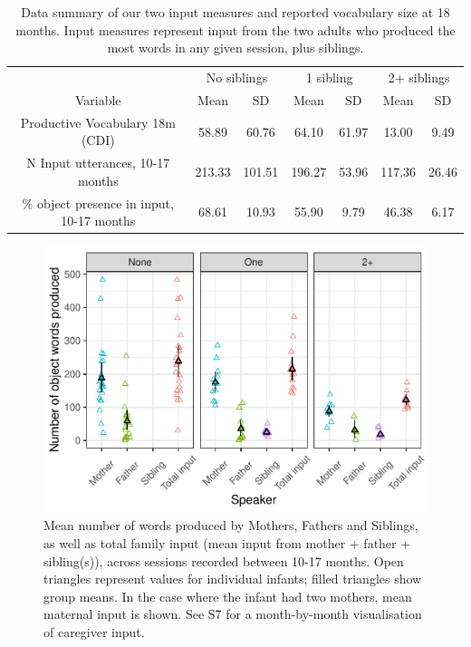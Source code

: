 \documentclass[
  man,mask,floatsintext]{apa6}
\begin{document}
\begin{table}[!h]

\caption{\label{tab:table-data-summary}Data summary of our two input measures and reported vocabulary size at 18 months. Input measures represent input from the two adults who produced the most words in any given session, plus siblings.}
\centering
\begin{tabular}[t]{ccccccc}
\toprule
\multicolumn{1}{c}{ } & \multicolumn{2}{c}{No siblings} & \multicolumn{2}{c}{1 sibling} & \multicolumn{2}{c}{2+ siblings} \\
\cmidrule(l{3pt}r{3pt}){2-3} \cmidrule(l{3pt}r{3pt}){4-5} \cmidrule(l{3pt}r{3pt}){6-7}
\multicolumn{1}{c}{Variable} & \multicolumn{1}{c}{Mean} & \multicolumn{1}{c}{SD} & \multicolumn{1}{c}{Mean} & \multicolumn{1}{c}{SD} & \multicolumn{1}{c}{Mean} & \multicolumn{1}{c}{SD} \\
\cmidrule(l{3pt}r{3pt}){1-1} \cmidrule(l{3pt}r{3pt}){2-2} \cmidrule(l{3pt}r{3pt}){3-3} \cmidrule(l{3pt}r{3pt}){4-4} \cmidrule(l{3pt}r{3pt}){5-5} \cmidrule(l{3pt}r{3pt}){6-6} \cmidrule(l{3pt}r{3pt}){7-7}
Productive Vocabulary 18m (CDI) & 58.89 & 60.76 & 64.10 & 61.97 & 13.00 & 9.49\\
N Input utterances, 10-17 months & 213.33 & 101.51 & 196.27 & 53.96 & 117.36 & 26.46\\
\% object presence in input, 10-17 months & 68.61 & 10.93 & 55.90 & 9.79 & 46.38 & 6.17\\
\bottomrule
\end{tabular}
\end{table}

\begin{figure}
\centering
\includegraphics{SiblingsStudyText-anon-revisions_files/figure-latex/Figure-Speaker-count-1.pdf}
\caption{\label{fig:Figure-Speaker-count}Mean number of words produced by Mothers, Fathers and Siblings, as well as total family input (mean input from mother + father + sibling(s)), across sessions recorded between 10-17 months. Open triangles represent values for individual infants; filled triangles show group means. In the case where the infant had two mothers, mean maternal input is shown. See S7 for a month-by-month visualisation of caregiver input.}
\end{figure}
\end{document}
